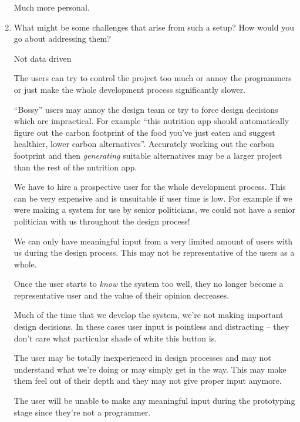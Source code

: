 \documentclass[10pt,\jkfside,a4paper]{article}
\begin{document}
\begin{enumerate}[label=(\alph*)]
Much more personal.

\item What might be some challenges that arise from such a setup?
How would you go about addressing them?

Not data driven

The users can try to control the project too much or annoy the programmers or just make the whole development process
significantly slower.

``Bossy'' users may annoy the design team or try to force design decisions which are impractical.
For example ``this nutrition app should automatically figure out the carbon footprint of the food you've
just eaten and suggest healthier, lower carbon alternatives''.
Accurately working out the carbon footprint and then \textit{generating} suitable alternatives  may be a larger project
than the rest of the nutrition app.

We have to hire a prospective user for the whole development process.
This can be very expensive and is unsuitable if user time is low.
For example if we were making a system for use by senior politicians, we could not have a
senior politician with us throughout the design process!

We can only have meaningful input from a very limited amount of users with us during the design process.
This may not be representative of the users as a whole.

Once the user starts to \textit{know} the system too well, they no longer become a representative user
and the value of their opinion decreases.

Much of the time that we develop the system, we're not making important design decisions.
In these cases user input is pointless and distracting -- they don't care what particular shade
of white this button is.

The user may be totally inexperienced in design processes and may not understand what we're doing or may simply get
in the way. This may make them feel out of their depth and they may not give proper input anymore.

The user will be unable to make any meaningful input during the prototyping stage since they're not a programmer.

\end{enumerate}
\end{document}
